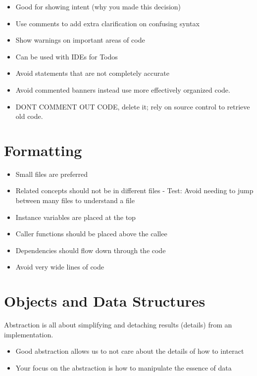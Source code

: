 \documentclass[11pt]{scrartcl} %
\begin{document}
\begin{itemize}

	\item Good for showing intent (why you made this decision)
	\item Use comments to add extra clarification on confusing syntax
	\item Show warnings on important areas of code
	\item Can be used with IDEs for Todos
	
	\item Avoid statements that are not completely accurate
	\item Avoid commented banners instead use more effectively organized code.
	
	\item DONT COMMENT OUT CODE, delete it; rely on source control to retrieve old code.
	
\end{itemize}

\section{Formatting}

\begin{itemize}
	\item Small files are preferred
	\item Related concepts should not be in different files
	  - Test: Avoid needing to jump between many files to understand a file
	
	\item Instance variables are placed at the top
	\item Caller functions should be placed above the callee
	\item Dependencies should flow down through the code
	\item Avoid very wide lines of code
	
\end{itemize}

\section{Objects and Data Structures}

Abstraction is all about simplifying and detaching results (details) from an implementation.
\begin{itemize}
	\item Good abstraction allows us to not care about the details of how to interact
	\item Your focus on the abstraction is how to manipulate the essence of data
\end{itemize}
\end{document}
